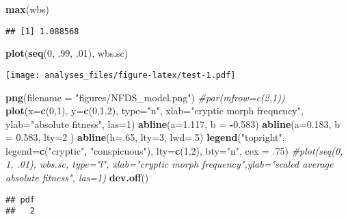 \documentclass[]{article}
\newenvironment{Shaded}{\begin{snugshade}}{\end{snugshade}}
\newcommand{\KeywordTok}[1]{\textcolor[rgb]{0.13,0.29,0.53}{\textbf{#1}}}
\newcommand{\DataTypeTok}[1]{\textcolor[rgb]{0.13,0.29,0.53}{#1}}
\newcommand{\DecValTok}[1]{\textcolor[rgb]{0.00,0.00,0.81}{#1}}
\newcommand{\FloatTok}[1]{\textcolor[rgb]{0.00,0.00,0.81}{#1}}
\newcommand{\StringTok}[1]{\textcolor[rgb]{0.31,0.60,0.02}{#1}}
\newcommand{\CommentTok}[1]{\textcolor[rgb]{0.56,0.35,0.01}{\textit{#1}}}
\newcommand{\OperatorTok}[1]{\textcolor[rgb]{0.81,0.36,0.00}{\textbf{#1}}}
\newcommand{\NormalTok}[1]{#1}
\begin{document}
\begin{Shaded}
\begin{Highlighting}[]
\KeywordTok{max}\NormalTok{(wbs)}
\end{Highlighting}
\end{Shaded}

\begin{verbatim}
## [1] 1.088568
\end{verbatim}

\begin{Shaded}
\begin{Highlighting}[]
\KeywordTok{plot}\NormalTok{(}\KeywordTok{seq}\NormalTok{(}\DecValTok{0}\NormalTok{, .}\DecValTok{99}\NormalTok{, .}\DecValTok{01}\NormalTok{), wbs.sc)}
\end{Highlighting}
\end{Shaded}

\texttt{[image: analyses\_files/figure-latex/test-1.pdf]}

\begin{Shaded}
\begin{Highlighting}[]
\KeywordTok{png}\NormalTok{(}\DataTypeTok{filename =} \StringTok{"figures/NFDS_model.png"}\NormalTok{)}
\CommentTok{#par(mfrow=c(2,1))}
\KeywordTok{plot}\NormalTok{(}\DataTypeTok{x=}\KeywordTok{c}\NormalTok{(}\DecValTok{0}\NormalTok{,}\DecValTok{1}\NormalTok{), }\DataTypeTok{y=}\KeywordTok{c}\NormalTok{(}\DecValTok{0}\NormalTok{,}\FloatTok{1.2}\NormalTok{), }\DataTypeTok{type=}\StringTok{"n"}\NormalTok{,}
     \DataTypeTok{xlab=}\StringTok{"cryptic morph frequency"}\NormalTok{,}
     \DataTypeTok{ylab=}\StringTok{"absolute fitness"}\NormalTok{,}
     \DataTypeTok{las=}\DecValTok{1}\NormalTok{)}
\KeywordTok{abline}\NormalTok{(}\DataTypeTok{a=}\FloatTok{1.117}\NormalTok{, }\DataTypeTok{b =} \OperatorTok{-}\FloatTok{0.583}\NormalTok{)}
\KeywordTok{abline}\NormalTok{(}\DataTypeTok{a=}\FloatTok{0.183}\NormalTok{, }\DataTypeTok{b =} \FloatTok{0.583}\NormalTok{, }\DataTypeTok{lty=}\DecValTok{2}\NormalTok{ )}
\KeywordTok{abline}\NormalTok{(}\DataTypeTok{h=}\NormalTok{.}\DecValTok{65}\NormalTok{, }\DataTypeTok{lty=}\DecValTok{3}\NormalTok{, }\DataTypeTok{lwd=}\NormalTok{.}\DecValTok{5}\NormalTok{)}
\KeywordTok{legend}\NormalTok{(}\StringTok{"topright"}\NormalTok{, }
       \DataTypeTok{legend=}\KeywordTok{c}\NormalTok{(}\StringTok{"cryptic"}\NormalTok{, }\StringTok{"conspicuous"}\NormalTok{),}
       \DataTypeTok{lty=}\KeywordTok{c}\NormalTok{(}\DecValTok{1}\NormalTok{,}\DecValTok{2}\NormalTok{),}
       \DataTypeTok{bty=}\StringTok{"n"}\NormalTok{, }\DataTypeTok{cex =}\NormalTok{ .}\DecValTok{75}\NormalTok{)}
\CommentTok{#plot(seq(0, 1, .01), wbs.sc, type="l", xlab="cryptic morph frequency",ylab="scaled average absolute fitness", las=1)}
\KeywordTok{dev.off}\NormalTok{()}
\end{Highlighting}
\end{Shaded}

\begin{verbatim}
## pdf 
##   2
\end{verbatim}
\end{document}

